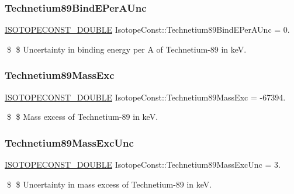 \subsubsection{\texorpdfstring{Technetium89\+Bind\+E\+Per\+A\+Unc}{Technetium89BindEPerAUnc}}
{\footnotesize\ttfamily \mbox{\hyperlink{group___isotope_const-_macros_ga8f45a7272ce02c0b4c65c44636ed719a}{I\+S\+O\+T\+O\+P\+E\+C\+O\+N\+S\+T\+\_\+\+D\+O\+U\+B\+LE}} Isotope\+Const\+::\+Technetium89\+Bind\+E\+Per\+A\+Unc = 0.}

\$ \$ Uncertainty in binding energy per A of Technetium-\/89 in keV. \mbox{\label{group___isotope_const-_technetium-_tc89_gac53eb578c72a7e962fecb90fe6889876}} 
\subsubsection{\texorpdfstring{Technetium89\+Mass\+Exc}{Technetium89MassExc}}
{\footnotesize\ttfamily \mbox{\hyperlink{group___isotope_const-_macros_ga8f45a7272ce02c0b4c65c44636ed719a}{I\+S\+O\+T\+O\+P\+E\+C\+O\+N\+S\+T\+\_\+\+D\+O\+U\+B\+LE}} Isotope\+Const\+::\+Technetium89\+Mass\+Exc = -\/67394.}

\$ \$ Mass excess of Technetium-\/89 in keV. \mbox{\label{group___isotope_const-_technetium-_tc89_ga925129b73fbfa6b11a77c7f7aced7154}} 
\subsubsection{\texorpdfstring{Technetium89\+Mass\+Exc\+Unc}{Technetium89MassExcUnc}}
{\footnotesize\ttfamily \mbox{\hyperlink{group___isotope_const-_macros_ga8f45a7272ce02c0b4c65c44636ed719a}{I\+S\+O\+T\+O\+P\+E\+C\+O\+N\+S\+T\+\_\+\+D\+O\+U\+B\+LE}} Isotope\+Const\+::\+Technetium89\+Mass\+Exc\+Unc = 3.}

\$ \$ Uncertainty in mass excess of Technetium-\/89 in keV. \mbox{\label{group___isotope_const-_technetium-_tc89_ga5056c351baf776c602d0f7dbb5e4c86e}} 
